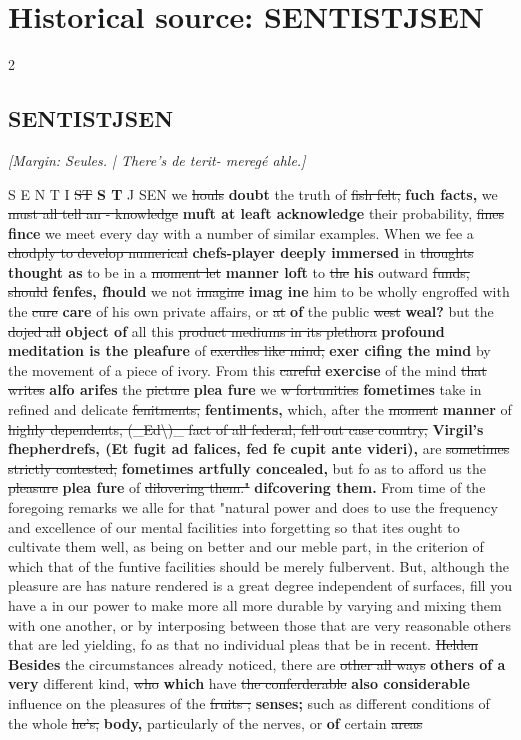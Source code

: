 \documentclass[10pt]{article}
\begin{document}
\section*{Historical source: SENTISTJSEN}
\begin{multicols}{2}
\subsection*{SENTISTJSEN}
{\small\itshape [Margin: Seules. | There’s \emph{de terit-} \emph{meregé ahle.}]}\par
S E N T I \sout{ST} \textbf{S T} J SEN we \sout{houls} \textbf{doubt} the truth of \sout{fish felt,} \textbf{fuch facts,} we \sout{must all tell an - knowledge} \textbf{muft at leaft acknowledge} their probability, \sout{fines} \textbf{fince} we meet every day with a number of similar examples. When we fee a \sout{chodply to develop numerical} \textbf{chefs-player deeply immersed} in \sout{thoughts} \textbf{thought as} to be in a \sout{moment let} \textbf{manner loft} to \sout{the} \textbf{his} outward \sout{funds, should} \textbf{fenfes, fhould} we not \sout{imagine} \textbf{imag ine} him to be wholly engroffed with the \sout{cure} \textbf{care} of his own private affairs, or \sout{at} \textbf{of} the public \sout{west} \textbf{weal?} but the \sout{dojed all} \textbf{object of} all this \sout{product mediums in its plethora} \textbf{profound meditation is the pleafure} of \sout{exerdles like mind,} \textbf{exer cifing the mind} by the movement of a piece of ivory. From this \sout{careful} \textbf{exercise} of the mind \sout{that writes} \textbf{alfo arifes} the \sout{picture} \textbf{plea fure} we \sout{w fortunities} \textbf{fometimes} take in refined and delicate \sout{fenitments,} \textbf{fentiments,} which, after the \sout{moment} \textbf{manner} of \sout{highly dependents, (\_Ed\textbackslash{})\_ fact of all federal, fell out case country,} \textbf{Virgil's fhepherdrefs, (Et fugit ad falices, fed fe cupit ante videri),} are \sout{sometimes strictly contested,} \textbf{fometimes artfully concealed,} but fo as to afford us the \sout{pleasure} \textbf{plea fure} of \sout{dilovering them."} \textbf{difcovering them.} From time of the foregoing remarks we alle for that "natural power and does to use the frequency and excellence of our mental facilities into forgetting so that ites ought to cultivate them well, as being on better and our meble part, in the criterion of which that of the funtive facilities should be merely fulbervent. But, although the pleasure are has nature rendered is a great degree independent of surfaces, fill you have a in our power to make more all more durable by varying and mixing them with one another, or by interposing between those that are very reasonable others that are led yielding, fo as that no individual pleas that be in recent. \sout{Helden} \textbf{Besides} the circumstances already noticed, there are \sout{other all ways} \textbf{others of a very} different kind, \sout{who} \textbf{which} have \sout{the conferderable} \textbf{also considerable} influence on the pleasures of the \sout{fruits ;} \textbf{senses;} such as different conditions of the whole \sout{he's,} \textbf{body,} particularly of the nerves, or \textbf{of} certain \sout{areas} 
\end{multicols}
\end{document}
